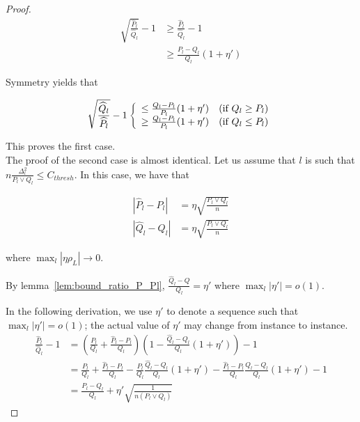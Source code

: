 \begin{proof}
\begin{align*}
\sqrt{ \frac{\hat{P}_l}{\hat{Q}_l} } - 1 &\geq \frac{\hat{P}_l}{\hat{Q}_l} - 1 \\
   &\geq \frac{P_l - Q_l}{Q_l} (1 + \eta')
\end{align*}




Symmetry yields that 

\begin{align*}
\sqrt{ \frac{\widehat{Q}_l}{\widehat{P}_l} } - 1  &
   \left\{ \begin{array}{cc}
      \leq \frac{Q_l - P_l}{P_l} (1 + \eta') & \textrm{(if $Q_l \geq P_l$)} \\
      \geq \frac{Q_l - P_l}{P_l} (1 + \eta') & \textrm{(if $Q_l \leq P_l$)} 
     \end{array} \right. \\
\end{align*}

This proves the first case. \\

The proof of the second case is almost identical. Let us assume that $l$ is such that $n \frac{\Delta_l^2}{P_l \vee Q_l} \leq C_{thresh}$. In this case, we have that

\begin{align*}
| \hat{P}_l - P_l | &= \eta \sqrt{ \frac{P_l \vee Q_l}{n} } \\
| \hat{Q}_l - Q_l | &= \eta \sqrt{ \frac{P_l \vee Q_l}{n} }
\end{align*}

where $\max_l |\eta \rho_L| \rightarrow 0$. 

By lemma~\ref{lem:bound_ratio_P_Pl}, $\frac{\hat{Q}_l - Q}{Q_l} = \eta'$ where $\max_l |\eta'| = o(1)$.

In the following derivation, we use $\eta'$ to denote a sequence such that $\max_l |\eta'| = o(1)$; the actual value of $\eta'$ may change from instance to instance. 
\begin{align*}
\frac{\hat{P}_l}{\hat{Q}_l} - 1 &= 
     \left( \frac{P_l}{Q_l} + \frac{\hat{P}_l - P_l}{Q_l} \right)
     \left( 1 - \frac{\hat{Q}_l - Q_l}{Q_l} ( 1 + \eta') \right) - 1 \\
 &= \frac{P_l}{Q_l} + \frac{\hat{P}_l - P_l}{Q_l} 
     - \frac{P_l}{Q_l} \frac{\hat{Q}_l - Q_l}{Q_l} (1 + \eta') 
     - \frac{\hat{P}_l - P_l}{Q_l} \frac{\hat{Q}_l - Q_l}{Q_l}(1+ \eta') 
   - 1  \\
 &= \frac{P_l - Q_l}{Q_l} + \eta' \sqrt{ \frac{1}{ n (P_l \vee Q_l)} } 
\end{align*}


\end{proof}
